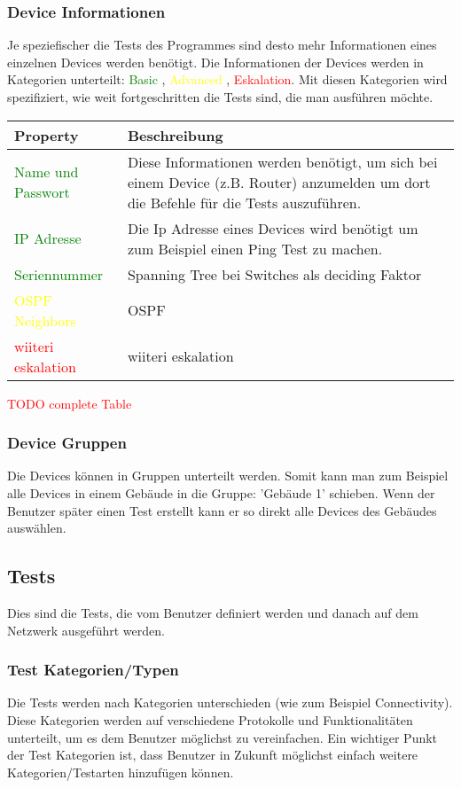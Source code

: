 \documentclass[
	ngerman,
	toc=listof, %
	toc=bibliography, %
	footnotes=multiple, %
	parskip=half, %
	numbers=noendperiod %
]{scrartcl}
\begin{document}
		\subsubsection{Device Informationen}
			Je speziefischer die Tests des Programmes sind desto mehr Informationen eines einzelnen Devices werden benötigt.
			Die Informationen der Devices werden in Kategorien unterteilt: \textcolor{green}{Basic} , \textcolor{yellow}{Advanced} , \textcolor{red}{Eskalation}.
			Mit diesen Kategorien wird spezifiziert, wie weit fortgeschritten die Tests sind, die man ausführen möchte. \\

			\begin{tabularx}{\textwidth}{lX}
				\toprule
				Property & Beschreibung\\
				\midrule
				\textcolor{green}{Name und Passwort} & Diese Informationen werden benötigt, um sich bei einem Device (z.B. Router) anzumelden um dort die Befehle für die Tests auszuführen. \\	
				\textcolor{green}{IP Adresse} & Die Ip Adresse eines Devices wird benötigt um zum Beispiel einen Ping Test zu machen. \\
				\textcolor{green}{Seriennummer} & Spanning Tree bei Switches als deciding Faktor \\
				\midrule
				\textcolor{yellow}{OSPF Neighbors} & OSPF \\
				\midrule
				\textcolor{red}{wiiteri eskalation} & wiiteri eskalation \\				
				\bottomrule
			\end{tabularx}

			\textcolor{red}{TODO complete Table}

		\subsubsection{Device Gruppen}
			Die Devices können in Gruppen unterteilt werden. Somit kann man zum Beispiel alle Devices in einem Gebäude in die Gruppe: 'Gebäude 1' schieben.
			Wenn der Benutzer später einen Test erstellt kann er so direkt alle Devices des Gebäudes auswählen. 

	\subsection{Tests}
		Dies sind die Tests, die vom Benutzer definiert werden und danach auf dem Netzwerk ausgeführt werden.
		
		\subsubsection{Test Kategorien/Typen}
			Die Tests werden nach Kategorien unterschieden (wie zum Beispiel Connectivity). Diese Kategorien werden auf verschiedene Protokolle und Funktionalitäten unterteilt, um es dem Benutzer möglichst zu vereinfachen.
			Ein wichtiger Punkt der Test Kategorien ist, dass Benutzer in Zukunft möglichst einfach weitere Kategorien/Testarten hinzufügen können.
\end{document}
